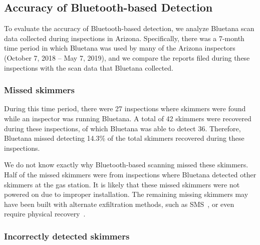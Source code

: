 




\subsection{Accuracy of Bluetooth-based Detection} %

To evaluate the accuracy of Bluetooth-based detection, we analyze Bluetana scan
data collected during inspections in Arizona. Specifically, there was a 7-month
time period in which Bluetana was used by many of the Arizona inspectors
(October 7, 2018 -- May 7, 2019), and we compare the reports filed during these
inspections with the scan data that Bluetana collected.

\subsubsection*{Missed skimmers}
\label{sec:falsenegative}


During this time period, there were 27 inspections where
skimmers were found while an inspector was running Bluetana.
%
A total of 42 skimmers were
recovered during these inspections, of which Bluetana was able to detect 36.
%
Therefore, Bluetana missed detecting 14.3\% of the total skimmers recovered during these inspections.

We do not know exactly why Bluetooth-based scanning missed these skimmers.
%
Half of the missed skimmers were from inspections where Bluetana detected other
skimmers at the gas station.
%
It is likely that these missed skimmers were not powered on due to
improper installation.
%
The remaining missing skimmers may have been built with alternate
exfiltration methods, such as SMS~\cite{scaifeoakland}, or even require physical
recovery~\cite{skimreaper2018}.

%
	

\subsubsection*{Incorrectly detected skimmers}
\label{sec:falsepositive}

